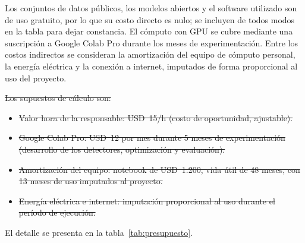 \documentclass[
11pt, %
]{charter}
\providecommand{\DIFdel}[1]{{\protect\color{red}\sout{#1}}} %
\providecommand{\DIFdelbegin}{} %
\providecommand{\DIFdelend}{} %
\begin{document}
Los conjuntos de datos públicos, los modelos abiertos y el software utilizado son de uso gratuito, por lo que su costo directo es nulo; se incluyen de todos modos en la tabla para dejar constancia. El cómputo con GPU se cubre mediante una suscripción a Google Colab Pro durante los meses de experimentación. Entre los costos indirectos se consideran la amortización del equipo de cómputo personal, la energía eléctrica y la conexión a internet, imputados de forma proporcional al uso del proyecto.

\DIFdelbegin \DIFdel{Los supuestos de cálculo son:
}%
\begin{itemize}%
\item%
\DIFdel{Valor hora de la responsable: USD~15/h (costo de oportunidad, ajustable).
	}%
\item%
\DIFdel{Google Colab Pro: USD~12 por mes durante 5 meses de experimentación (desarrollo de los detectores, optimización y evaluación).
	}%
\item%
\DIFdel{Amortización del equipo: notebook de USD~1.200, vida útil de 48 meses, con 13 meses de uso imputados al proyecto.
	}%
\item%
\DIFdel{Energía eléctrica e internet: imputación proporcional al uso durante el período de ejecución.
}
\end{itemize}%

\DIFdelend El detalle se presenta en la tabla~\ref{tab:presupuesto}.
\end{document}

